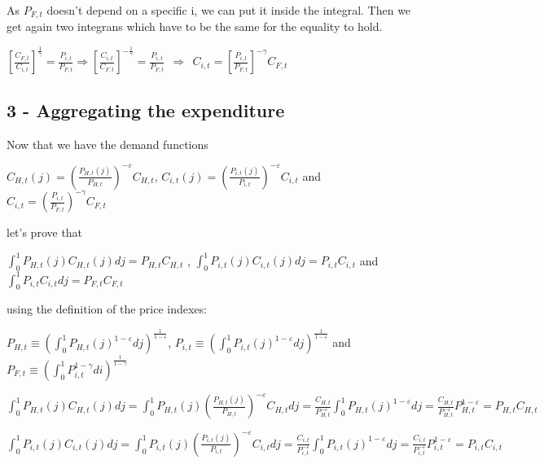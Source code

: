 \documentclass[
]{article}
\begin{document}
As \(P_{F,t}\) doesn't depend on a specific i, we can put it inside the
integral. Then we get again two integrans which have to be the same for
the equality to hold.

\(\displaystyle \left[\frac{C_{F,t}}{C_{i,t}}\right]^{\frac{1}{\gamma}} = \frac{P_{i,t}}{P_{F,t}} \Rightarrow \left[\frac{C_{i,t}}{C_{F,t}}\right]^{-\frac{1}{\gamma}} = \frac{P_{i,t}}{P_{F,t}} \ \ \Rightarrow \ \ C_{i,t} = \left[ \frac{P_{i,t}}{P_{F,t}} \right]^{-\gamma}C_{F,t}\)

\hypertarget{aggregating-the-expenditure}{%
\subsection{3 - Aggregating the
expenditure}\label{aggregating-the-expenditure}}

Now that we have the demand functions

\(\displaystyle C_{H,t}(j)= \left( \frac{P_{H,t}(j)}{P_{H,t}}\right)^{-\varepsilon}C_{H,t}\),
\(\displaystyle C_{i,t}(j)= \left( \frac{P_{i,t}(j)}{P_{i,t}}\right)^{-\varepsilon}C_{i,t}\)
and
\(\displaystyle C_{i,t}= \left( \frac{P_{i,t}}{P_{F,t}}\right)^{-\gamma}C_{F,t}\)

let's prove that

\(\displaystyle \int_0^1 P_{H,t}(j)C_{H,t}(j)dj = P_{H,t}C_{H,t}\) ,
\(\displaystyle \int_0^1 P_{i,t}(j)C_{i,t}(j)dj = P_{i,t}C_{i,t}\) and
\(\displaystyle \int_0^1 P_{i,t}C_{i,t}dj = P_{F,t}C_{F,t}\)

using the definition of the price indexes:

\(\displaystyle P_{H,t} \equiv \left( \int_0^1 P_{H,t}(j)^{1-\varepsilon}dj \right)^{\frac{1}{1-\varepsilon}}\),
\(\displaystyle P_{i,t} \equiv \left( \int_0^1 P_{i,t}(j)^{1-\varepsilon}dj \right)^{\frac{1}{1-\varepsilon}}\)
and
\(\displaystyle P_{F,t} \equiv \left( \int_0^1 P_{i,t}^{1-\gamma}di \right)^{\frac{1}{1-\gamma}}\)

\(\displaystyle \int_0^1 P_{H,t}(j)C_{H,t}(j)dj = \int_0^1P_{H,t}(j)\left( \frac{P_{H,t}(j)}{P_{H,t}}\right)^{-\varepsilon}C_{H,t}dj = \frac{C_{H,t}}{P_{H,t}^{-\varepsilon}}\int_0^1P_{H,t}(j)^{1-\varepsilon}dj = \frac{C_{H,t}}{P_{H,t}^{-\varepsilon}}P_{H,t}^{1-\varepsilon} = P_{H,t}C_{H,t}\)

\(\displaystyle \int_0^1 P_{i,t}(j)C_{i,t}(j)dj = \int_0^1P_{i,t}(j)\left( \frac{P_{i,t}(j)}{P_{i,t}}\right)^{-\varepsilon}C_{i,t}dj = \frac{C_{i,t}}{P_{i,t}^{-\varepsilon}}\int_0^1 P_{i,t}(j)^{1-\varepsilon}dj = \frac{C_{i,t}}{P_{i,t}^{-\varepsilon}}P_{i,t}^{1-\varepsilon} = P_{i,t}C_{i,t}\)
\end{document}
